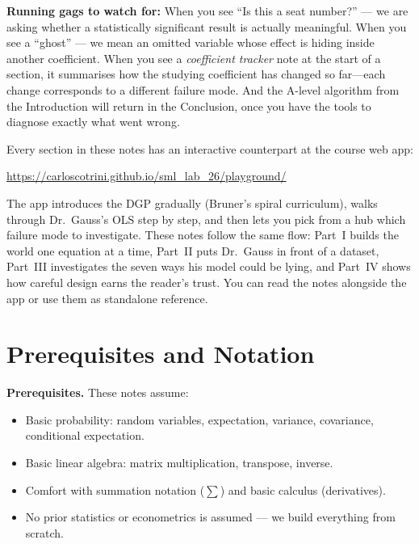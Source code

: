 \documentclass[11pt,a4paper]{article}
\theoremstyle{definition}
\theoremstyle{plain}
\theoremstyle{remark}
\begin{document}
\medskip
\noindent\textbf{Running gags to watch for:} When you see ``Is this a seat number?'' --- we are asking whether a statistically significant result is actually meaningful. When you see a ``ghost'' --- we mean an omitted variable whose effect is hiding inside another coefficient. When you see a \emph{coefficient tracker} note at the start of a section, it summarises how the studying coefficient has changed so far---each change corresponds to a different failure mode. And the A-level algorithm from the Introduction will return in the Conclusion, once you have the tools to diagnose exactly what went wrong.

\medskip

\begin{keyinsight}[title={Companion interactive web app}]
Every section in these notes has an interactive counterpart at the course web app:
\begin{center}
\url{https://carloscotrini.github.io/sml_lab_26/playground/}
\end{center}
The app introduces the DGP gradually (Bruner's spiral curriculum), walks through
Dr.\ Gauss's OLS step by step, and then lets you pick from a hub which failure
mode to investigate. These notes follow the same flow: Part~I builds the world
one equation at a time, Part~II puts Dr.\ Gauss in front of a dataset, Part~III
investigates the seven ways his model could be lying, and Part~IV shows how
careful design earns the reader's trust. You can read the notes alongside the
app or use them as standalone reference.
\end{keyinsight}

\newpage

\section*{Prerequisites and Notation}

\textbf{Prerequisites.} These notes assume:
\begin{itemize}[nosep]
  \item Basic probability: random variables, expectation, variance, covariance, conditional expectation.
  \item Basic linear algebra: matrix multiplication, transpose, inverse.
  \item Comfort with summation notation ($\sum$) and basic calculus (derivatives).
  \item No prior statistics or econometrics is assumed --- we build everything from scratch.
\end{itemize}
\end{document}
